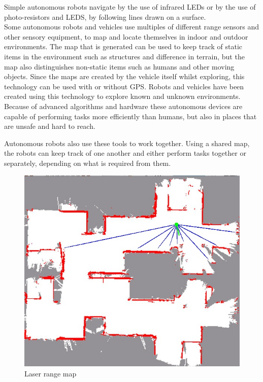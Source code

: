 Simple autonomous robots navigate by the use of infrared LEDs or by the use of photo-resistors and LEDS, by following lines drawn on a surface.\\
Some autonomous robots and vehicles use multiples of different range sensors and other sensory equipment, to map and locate themselves in indoor and outdoor environments. The map that is generated can be used to keep track of static items in the environment such as structures and difference in terrain, but the map also distinguishes non-static items such as humans and other moving objects. Since the maps are created by the vehicle itself whilst exploring, this technology can be used with or without GPS\cite{rangesens}\cite{rangesensarc}.  Robots and vehicles have been created using this technology to explore known and unknown environments. Because of advanced algorithms and hardware these autonomous devices are capable of performing tasks more efficiently than humans, but also in places that are unsafe and hard to reach.

Autonomous robots also use these tools to work together. Using a shared map, the robots can keep track of one another and either perform tasks together or separately, depending on what is required from them.

\begin{figure}[H]
	\centering
	\includegraphics[scale=.7]{images/laserrangemap.jpg}
	\caption{Laser range map}
	\label{fig:laserrangemap}
\end{figure}

